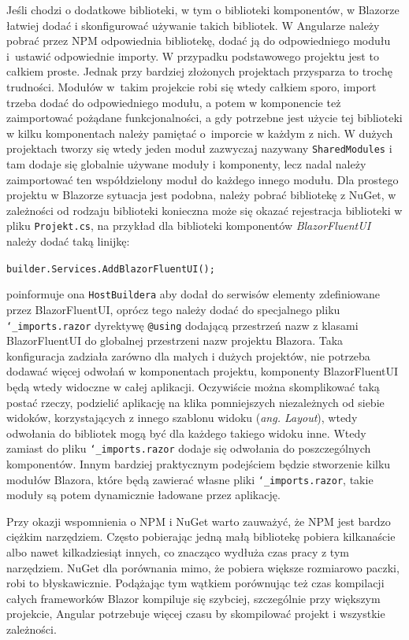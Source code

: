 \documentclass[12pt,a4paper,oneside]{book}
\begin{document}
Jeśli chodzi o dodatkowe biblioteki, w tym o biblioteki komponentów, w Blazorze łatwiej dodać i skonfigurować używanie takich bibliotek. W Angularze należy pobrać przez NPM odpowiednia bibliotekę, dodać ją do odpowiedniego modułu i~ustawić odpowiednie importy. W przypadku podstawowego projektu jest to całkiem proste. Jednak przy bardziej złożonych projektach przysparza to trochę trudności. Modułów w~takim projekcie robi się wtedy całkiem sporo, import trzeba dodać do odpowiedniego modułu, a potem w komponencie też zaimportować pożądane funkcjonalności, a gdy potrzebne jest użycie tej biblioteki w kilku komponentach należy pamiętać o~imporcie w każdym z nich. W dużych projektach tworzy się wtedy jeden moduł zazwyczaj nazywany \texttt{SharedModules} i tam dodaje się globalnie używane moduły i komponenty, lecz nadal należy zaimportować ten współdzielony moduł do każdego innego modułu. Dla prostego projektu w Blazorze sytuacja jest podobna, należy pobrać bibliotekę z NuGet, w zależności od rodzaju biblioteki konieczna może się okazać rejestracja biblioteki w pliku \texttt{Projekt.cs}, na przykład dla biblioteki komponentów \textit{BlazorFluentUI} należy dodać taką linijkę:
\begin{center}
  \texttt{builder.Services.AddBlazorFluentUI();}
\end{center}
poinformuje ona \texttt{HostBuildera} aby dodał do serwisów elementy zdefiniowane przez BlazorFluentUI, oprócz tego należy dodać do specjalnego pliku \texttt{\char`_imports.razor} dyrektywę \texttt{@using} dodającą przestrzeń nazw z klasami BlazorFluentUI do globalnej przestrzeni nazw projektu Blazora. Taka konfiguracja zadziała zarówno dla małych i dużych projektów, nie potrzeba dodawać więcej odwołań w komponentach projektu, komponenty BlazorFluentUI będą wtedy widoczne w całej aplikacji. Oczywiście można skomplikować taką postać rzeczy, podzielić aplikację na klika pomniejszych niezależnych od siebie widoków, korzystających z innego szablonu widoku (\textit{ang. Layout}), wtedy odwołania do bibliotek mogą być dla każdego takiego widoku inne. Wtedy zamiast do pliku \texttt{\char`_imports.razor} dodaje się odwołania do poszczególnych komponentów. Innym bardziej praktycznym podejściem będzie stworzenie kilku modułów Blazora, które będą zawierać własne pliki \texttt{\char`_imports.razor}, takie moduły są potem dynamicznie ładowane przez aplikację.

Przy okazji wspomnienia o NPM i NuGet warto zauważyć, że NPM jest bardzo ciężkim narzędziem. Często pobierając jedną małą bibliotekę pobiera kilkanaście albo nawet kilkadziesiąt innych, co znacząco wydłuża czas pracy z tym narzędziem. NuGet dla porównania mimo, że pobiera większe rozmiarowo paczki, robi to błyskawicznie. Podążając tym wątkiem porównując też czas kompilacji całych frameworków Blazor kompiluje się szybciej, szczególnie przy większym projekcie, Angular potrzebuje więcej czasu by skompilować projekt i wszystkie zależności.
\end{document}
